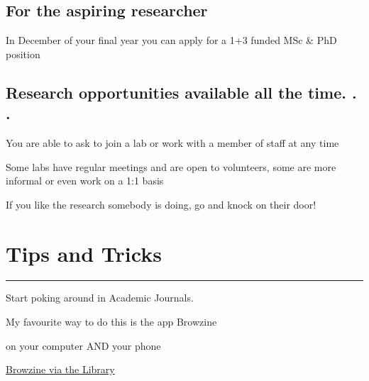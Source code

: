 \documentclass[
  letterpaper,
  DIV=11,
  numbers=noendperiod]{scrartcl}
\begin{document}
\hypertarget{for-the-aspiring-researcher}{%
\subsection{For the aspiring
researcher}\label{for-the-aspiring-researcher}}

\hfill\break
In December of your final year you can apply for a 1+3 funded MSc \& PhD
position

\hypertarget{research-opportunities-available-all-the-time.-.-.}{%
\subsection{Research opportunities available all the time. .
.}\label{research-opportunities-available-all-the-time.-.-.}}

You are able to ask to join a lab or work with a member of staff at any
time

\hfill\break
Some labs have regular meetings and are open to volunteers, some are
more informal or even work on a 1:1 basis

\hfill\break
If you like the research somebody is doing, go and knock on their door!

\hypertarget{tips-and-tricks}{%
\section{Tips and Tricks}\label{tips-and-tricks}}

\begin{center}\rule{0.5\linewidth}{0.5pt}\end{center}

\begin{tcolorbox}[enhanced jigsaw, arc=.35mm, opacitybacktitle=0.6, opacityback=0, leftrule=.75mm, colback=white, toprule=.15mm, rightrule=.15mm, coltitle=black, bottomrule=.15mm, bottomtitle=1mm, title=\textcolor{quarto-callout-tip-color}{\faLightbulb}\hspace{0.5em}{Tip Number 1}, colframe=quarto-callout-tip-color-frame, breakable, toptitle=1mm, titlerule=0mm, left=2mm, colbacktitle=quarto-callout-tip-color!10!white]

Start poking around in Academic Journals.

My favourite way to do this is the app Browzine

on your computer AND your phone

\href{https://browzine.com/libraries/1374/subjects/67/bookcases/169?sort=title}{Browzine
via the Library}

\end{tcolorbox}
\end{document}
